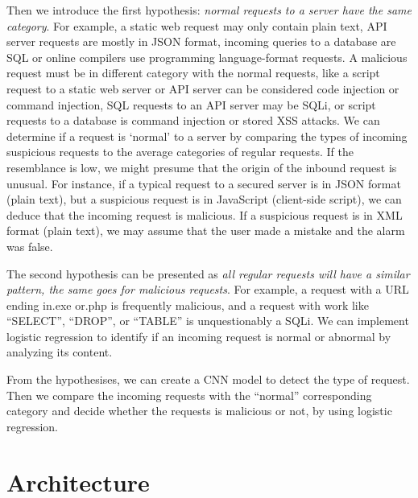 Then we introduce the first hypothesis: \textit{normal requests to a server have the same category}. For example, a static web request may only contain plain text, API server requests are mostly in JSON format, incoming queries to a database are SQL or online compilers use programming language-format requests. A malicious request must be in different category with the normal requests, like a script request to a static web server or API server can be considered code injection or command injection, SQL requests to an API server may be SQLi, or script requests to a database is command injection or stored XSS attacks. We can determine if a request is `normal' to a server by comparing the types of incoming suspicious requests to the average categories of regular requests. If the resemblance is low, we might presume that the origin of the inbound request is unusual. For instance, if a typical request to a secured server is in JSON format (plain text), but a suspicious request is in JavaScript (client-side script), we can deduce that the incoming request is malicious. If a suspicious request is in XML format (plain text), we may assume that the user made a mistake and the alarm was false.



The second hypothesis can be presented as \textit{all regular requests will have a similar pattern, the same goes for malicious requests}. For example, a request with a URL ending in.exe or.php is frequently malicious, and a request with work like ``SELECT'', ``DROP'', or ``TABLE'' is unquestionably a SQLi. We can implement logistic regression to identify if an incoming request is normal or abnormal by analyzing its content.

From the hypothesises, we can create a CNN model to detect the type of request. Then we compare the incoming requests with the ``normal'' corresponding category and decide whether the requests is malicious or not, by using logistic regression.

\section{Architecture}
\label{architecture design}

